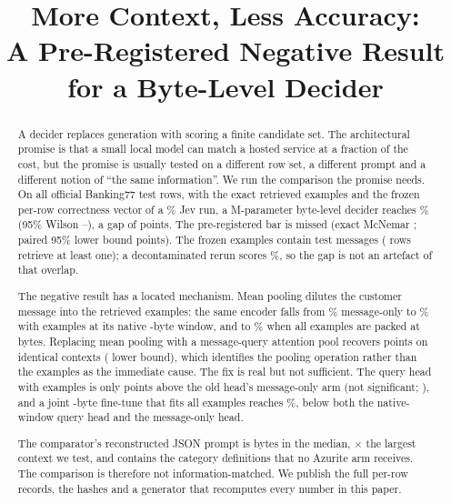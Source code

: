 \documentclass[11pt]{article}
\title{\textbf{More Context, Less Accuracy:}\\[0.2em]
A Pre-Registered Negative Result for a Byte-Level Decider}
\author{}
\begin{document}
\maketitle



\begin{abstract}
A decider replaces generation with scoring a finite candidate set. The
architectural promise is that a small local model can match a hosted service at
a fraction of the cost, but the promise is usually tested on a different row
set, a different prompt and a different notion of ``the same information''. We
run the comparison the promise needs. On all \PN{} official Banking77 test
rows, with the exact \PExamples{} retrieved examples and the frozen per-row
correctness vector of a \PJevAcc\% Jev run, a \PParamsM{}M-parameter byte-level
decider reaches \PQueryTwoAcc\% (95\% Wilson \PQueryTwoLo--\PQueryTwoHi), a gap
of \PQueryGapAbs{} points. The pre-registered bar is missed (exact McNemar
\PQueryPText; paired 95\% lower bound \PQueryLower{} points). The frozen
examples contain \PContamSupportMatches{} test messages (\PContamEvalRows{} rows
retrieve at least one); a decontaminated rerun scores \PCleanAcc\%, so the gap
is not an artefact of that overlap.

The negative result has a located mechanism. Mean pooling dilutes the customer
message into the retrieved examples: the same encoder falls from
\POldZeroAcc\% message-only to \POldTwoAcc\% with examples at its native
\PNativeBudget-byte window, and to \POldLenAcc\% when all \PExamples{} examples
are packed at \PSeq{} bytes. Replacing mean pooling with a message-query
attention pool recovers \PMechGain{} points on identical contexts
(\PMechLower{} lower bound), which identifies the pooling operation rather than
the examples as the immediate cause. The fix is real but not sufficient. The
query head with examples is only \PQueryVsOldZero{} points above the old head's
message-only arm (not significant; \PQueryVsOldZeroPText), and a joint
\PSeq-byte fine-tune that fits all \PExamples{} examples reaches \PLenTwoAcc\%,
below both the native-window query head and the message-only head.

The comparator's reconstructed JSON prompt is \PJevPromptMedian{} bytes in the
median, \PJevPromptRatio$\times$ the largest context we test, and contains the
\PLabels{} category definitions that no Azurite arm receives. The comparison is therefore not information-matched. We publish the full per-row records, the
hashes and a generator that recomputes every number in this paper.
\end{abstract}
\end{document}
